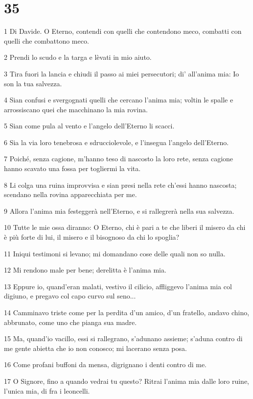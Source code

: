 \chapter{35}

\par 1 Di Davide. O Eterno, contendi con quelli che contendono meco, combatti con quelli che combattono meco.
\par 2 Prendi lo scudo e la targa e lèvati in mio aiuto.
\par 3 Tira fuori la lancia e chiudi il passo ai miei persecutori; di' all'anima mia: Io son la tua salvezza.
\par 4 Sian confusi e svergognati quelli che cercano l'anima mia; voltin le spalle e arrossiscano quei che macchinano la mia rovina.
\par 5 Sian come pula al vento e l'angelo dell'Eterno li scacci.
\par 6 Sia la via loro tenebrosa e sdrucciolevole, e l'insegua l'angelo dell'Eterno.
\par 7 Poiché, senza cagione, m'hanno teso di nascosto la loro rete, senza cagione hanno scavato una fossa per togliermi la vita.
\par 8 Li colga una ruina improvvisa e sian presi nella rete ch'essi hanno nascosta; scendano nella rovina apparecchiata per me.
\par 9 Allora l'anima mia festeggerà nell'Eterno, e si rallegrerà nella sua salvezza.
\par 10 Tutte le mie ossa diranno: O Eterno, chi è pari a te che liberi il misero da chi è più forte di lui, il misero e il bisognoso da chi lo spoglia?
\par 11 Iniqui testimoni si levano; mi domandano cose delle quali non so nulla.
\par 12 Mi rendono male per bene; derelitta è l'anima mia.
\par 13 Eppure io, quand'eran malati, vestivo il cilicio, affliggevo l'anima mia col digiuno, e pregavo col capo curvo sul seno...
\par 14 Camminavo triste come per la perdita d'un amico, d'un fratello, andavo chino, abbrunato, come uno che pianga sua madre.
\par 15 Ma, quand'io vacillo, essi si rallegrano, s'adunano assieme; s'aduna contro di me gente abietta che io non conosco; mi lacerano senza posa.
\par 16 Come profani buffoni da mensa, digrignano i denti contro di me.
\par 17 O Signore, fino a quando vedrai tu questo? Ritrai l'anima mia dalle loro ruine, l'unica mia, di fra i leoncelli.
